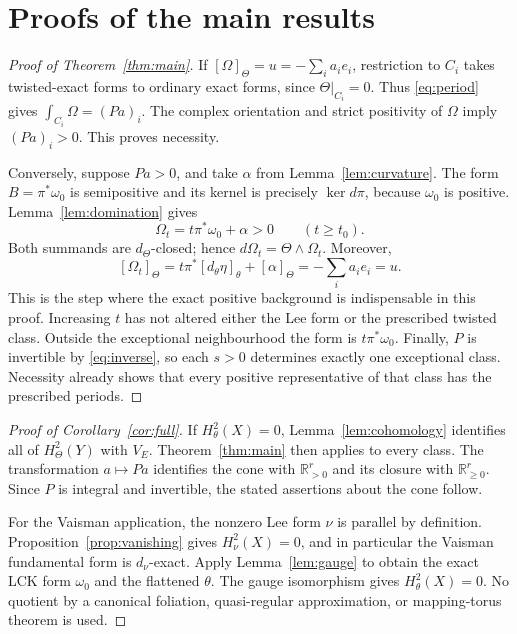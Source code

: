 \documentclass[12pt]{amsart}
\theoremstyle{definition}
\theoremstyle{remark}
\numberwithin{equation}{section}
\newcommand{\R}{\mathbb{R}}
\begin{document}
\section{Proofs of the main results}\label{sec:proofs}
\begin{proof}[Proof of Theorem~\ref{thm:main}]
If $[\Omega]_\Theta=u=-\sum_i a_ie_i$, restriction to $C_i$ takes twisted-exact forms to ordinary exact forms, since $\Theta|_{C_i}=0$. Thus \eqref{eq:period} gives $\int_{C_i}\Omega=(Pa)_i$. The complex orientation and strict positivity of $\Omega$ imply $(Pa)_i>0$. This proves necessity.

Conversely, suppose $Pa>0$, and take $\alpha$ from Lemma~\ref{lem:curvature}. The form $B=\pi^*\omega_0$ is semipositive and its kernel is precisely $\ker d\pi$, because $\omega_0$ is positive. Lemma~\ref{lem:domination} gives
\begin{equation}\label{eq:construction}
 \Omega_t=t\pi^*\omega_0+\alpha>0\qquad(t\geq t_0).
\end{equation}
Both summands are $d_\Theta$-closed; hence $d\Omega_t=\Theta\wedge\Omega_t$. Moreover,
\[
 [\Omega_t]_\Theta=t\pi^*[d_\theta\eta]_\theta+[\alpha]_\Theta
 =-\sum_i a_ie_i=u.
\]
This is the step where the exact positive background is indispensable in this proof. Increasing $t$ has not altered either the Lee form or the prescribed twisted class. Outside the exceptional neighbourhood the form is $t\pi^*\omega_0$. Finally, $P$ is invertible by \eqref{eq:inverse}, so each $s>0$ determines exactly one exceptional class. Necessity already shows that every positive representative of that class has the prescribed periods.
\end{proof}

\begin{proof}[Proof of Corollary~\ref{cor:full}]
If $H^2_\theta(X)=0$, Lemma~\ref{lem:cohomology} identifies all of $H^2_\Theta(Y)$ with $V_E$. Theorem~\ref{thm:main} then applies to every class. The transformation $a\mapsto Pa$ identifies the cone with $\R_{>0}^r$ and its closure with $\R_{\geq0}^r$. Since $P$ is integral and invertible, the stated assertions about the cone follow.

For the Vaisman application, the nonzero Lee form $\nu$ is parallel by definition. Proposition~\ref{prop:vanishing} gives $H^2_\nu(X)=0$, and in particular the Vaisman fundamental form is $d_\nu$-exact. Apply Lemma~\ref{lem:gauge} to obtain the exact LCK form $\omega_0$ and the flattened $\theta$. The gauge isomorphism gives $H^2_\theta(X)=0$. No quotient by a canonical foliation, quasi-regular approximation, or mapping-torus theorem is used.
\end{proof}
\end{document}
